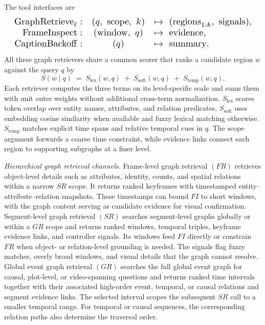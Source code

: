 \documentclass[letterpaper]{article} %
\begin{document}
The tool interfaces are
\[
\resizebox{\columnwidth}{!}{$
  \begin{array}{rcl}
  \mathrm{GraphRetrieve}_{\ell}: & (q,\ \mathrm{scope},\ k) & \mapsto\ (\mathrm{regions}_{1:k},\ \mathrm{signals}), \\
  \mathrm{FrameInspect}: & (\mathrm{window},\ q) & \mapsto\ \mathrm{evidence}, \\
  \mathrm{CaptionBackoff}: & (q) & \mapsto\ \mathrm{summary}.
  \end{array}
$}
\]
All three graph retrievers share a common scorer that ranks a candidate region $w$ against the query $q$ by
\begin{equation}
  S(w \mid q) \;=\; S_{\mathrm{lex}}(w,q) \;+\;
  S_{\mathrm{soft}}(w,q) \;+\; S_{\mathrm{temp}}(w,q).
\end{equation}
Each retriever computes the three terms on its level-specific scale and sums them with unit outer weights without additional cross-term normalization.
$S_{\mathrm{lex}}$ scores token overlap over entity names, attributes, and relation predicates.
$S_{\mathrm{soft}}$ uses embedding cosine similarity when available and fuzzy lexical matching otherwise.
$S_{\mathrm{temp}}$ matches explicit time spans and relative temporal cues in $q$.
The $\mathrm{scope}$ argument forwards a coarse time constraint, while evidence links connect each region to supporting subgraphs at a finer level.

\emph{Hierarchical graph retrieval channels.}
Frame-level graph retrieval \underline{$(FR)$} retrieves object-level details such as attributes, identity, counts, and spatial relations within a narrow $SR$ scope.
It returns ranked keyframes with timestamped entity--attribute--relation snapshots.
These timestamps can bound $FI$ to short windows, with the graph content serving as candidate evidence for visual confirmation.
Segment-level graph retrieval \underline{$(SR)$} searches segment-level graphs globally or within a $GR$ scope and returns ranked windows, temporal triples, keyframe evidence links, and controller signals.
Its windows feed $FI$ directly or constrain $FR$ when object- or relation-level grounding is needed.
The signals flag fuzzy matches, overly broad windows, and visual details that the graph cannot resolve.
Global event graph retrieval \underline{$(GR)$} searches the full global event graph for causal, plot-level, or video-spanning questions and returns ranked time intervals together with their associated high-order event, temporal, or causal relations and segment evidence links.
The selected interval scopes the subsequent $SR$ call to a smaller temporal range.
For temporal or causal sequences, the corresponding relation paths also determine the traversal order.
\end{document}
